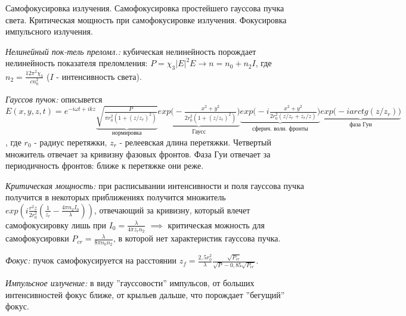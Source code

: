 
\begin{leftrules}
Самофокусировка излучения. Самофокусировка простейшего гауссова пучка света. Критическая мощность при самофокусировке излучения. Фокусировка импульсного излучения.
\end{leftrules}


\textit{Нелинейный пок-тель преломл.:} кубическая нелинейность порождает нелинейность показателя преломления: $P=\chi_{3} |E|^{2}E \to n=n_{0}+n_{2}I$, где $n_{2}=\frac{12\pi^{2} \chi_{3}}{cn_{0}^{2}}$ ($I$ - интенсивность света).


\textit{Гауссов пучок:} описывется \\ $ E(x,y,z,t) = e^{-i\omega t + i kz} \underbrace{\sqrt{\frac{P}{\pi r_{0}^{2}(1+(z/z_{r})^{2})}}}_{\text{нормировка}}  \underbrace{exp\bigg(-\frac{x^{2}+y^{2}}{2r_{0}^{2}(1+(z/z_{r})^{2})}\bigg)}_{\text{Гаусс}} \underbrace{exp\bigg(-i\frac{x^{2}+y^{2}}{2r_{0}^{2}(z/z_{r}+z_{r}/z)}\bigg)}_{\text{сферич. волн. фронты}} \underbrace{exp\bigg(-i arctg(z/z_{r})\bigg)}_{\text{фаза Гуи}}$, где $r_{0}$ - радиус перетяжки, $z_{r}$ - релеевская длина перетяжки. Четвертый множитель отвечает за кривизну фазовых фронтов. Фаза Гуи отвечает за периодичность фронтов: ближе к перетяжке они реже.


\textit{Критическая мощность:} при расписывании интенсивности и поля гауссова пучка получится в некоторых приближениях получится множитель $exp(i \frac{r^{2}z}{2r_{0}^{2}} (\frac{1}{z_{r}}-\frac{4\pi n_{2}I_{0}}{\lambda}))$, отвечающий за кривизну, который влечет самофокусировку лишь при $I_{0}=\frac{\lambda}{4\pi z_{r}n_{2}}$ $\implies$ критическая можность для самофокусировки $P_{cr}=\frac{\lambda}{8\pi n_{0}n_{2}}$, в которой нет характеристик гауссова пучка.


\textit{Фокус:} пучок самофокусируется на расстоянии $z_{f}=\frac{2,5 r_{0}^{2}}{\lambda} \frac{\sqrt{P_{cr}}}{\sqrt{P}-0,85\sqrt{P_{cr}}}$.


\textit{Импульсное излучение:} в виду ''гауссовости'' импульсов, от больших интенсивностей фокус ближе, от крыльев дальше, что порождает ''бегущий'' фокус.
